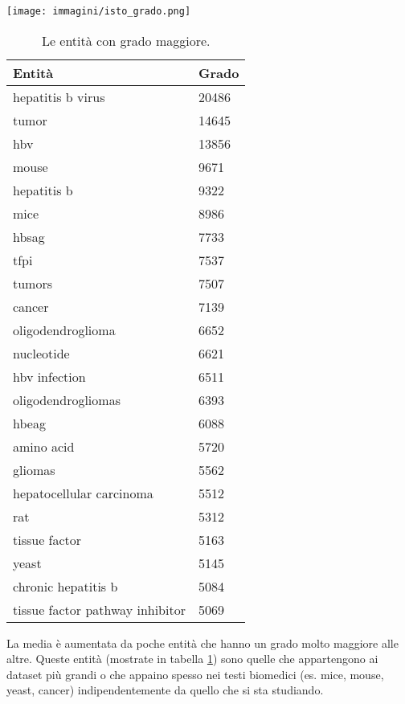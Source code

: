 \documentclass[12pt]{report}
\begin{document}
\begin{table}[!htb]
\begin{minipage}[b]{0.45\linewidth}
\centering
\texttt{[image: immagini/isto\_grado.png]}
\label{fig:isto_grado}
\end{minipage}
\begin{minipage}[b]{0.5\linewidth}
\centering
\begin{tabular}{|l|l|}
    \hline
    \textbf{Entità} & \textbf{Grado}\\
    \hline
    \small{hepatitis b virus} & \small{20486}\\
    \small{tumor} & \small{14645}  \\
    \small{hbv} & \small{13856} \\
    \small{mouse} & \small{9671} \\
    \small{hepatitis b} & \small{9322} \\
    \small{mice} & \small{8986} \\
    \small{hbsag} & \small{7733} \\
    \small{tfpi }& \small{7537} \\
    \small{tumors} & \small{7507} \\
    \small{cancer} & \small{7139} \\
    \small{oligodendroglioma} & \small{6652} \\
    \small{nucleotide} & \small{6621} \\
    \small{hbv infection} & \small{6511} \\
    \small{oligodendrogliomas} & \small{6393} \\
    \small{hbeag} & \small{6088} \\
    \small{amino acid} & \small{5720} \\
    \small{gliomas} & \small{5562} \\
    \small{hepatocellular carcinoma} & \small{5512} \\
    \small{rat} & \small{5312} \\
    \small{tissue factor} & \small{5163} \\
    \small{yeast} & \small{5145} \\
    \small{chronic hepatitis b} & \small{5084} \\
    \small{tissue factor pathway inhibitor} & \small{5069} \\
    \hline
    \end{tabular}
    \caption{\footnotesize{Le entità con grado maggiore.}}
    \label{tab:max_grado}
\end{minipage}\hfill
\end{table}
La media è aumentata da poche entità che hanno un grado molto maggiore alle altre. Queste entità (mostrate in tabella \ref{tab:max_grado}) sono quelle che appartengono ai dataset più grandi o che appaino spesso nei testi biomedici (es. mice, mouse, yeast, cancer) indipendentemente da quello che si sta studiando.
\end{document}
